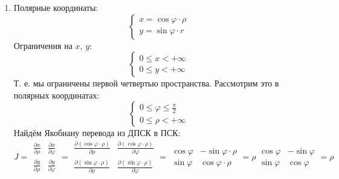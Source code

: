\begin{enumerate}
    \item
        Полярные координаты:
        \begin{equation}
            \begin{cases}
                x = \cos\varphi \cdot \rho \\
                y = \sin\varphi \cdot r
            \end{cases}
        \end{equation}
        Ограничения на $x$, $y$:
        \begin{equation}
            \begin{cases}
                0 \leq x < {+\infty} \\
                0 \leq y < {+\infty}
            \end{cases}
        \end{equation}
        Т. е. мы ограничены первой четвертью пространства. Рассмотрим это в полярных координатах: 
        \begin{equation}
            \begin{cases}
                0 \leq \varphi \leq \frac{\pi}{2} \\
                0 \leq \rho < {+\infty}
            \end{cases}
        \end{equation}
        Найдём Якобиану перевода из ДПСК в ПСК:
        $\displaystyle J = \begin{matrix}
            \frac{\partial x}{\partial \rho} & \frac{\partial x}{\partial \varphi} \\
            \frac{\partial y}{\partial \rho} & \frac{\partial y}{\partial \varphi}
        \end{matrix} = 
        \begin{matrix}
            \frac{\partial (\cos\varphi \cdot \rho)}{\partial \rho} & \frac{\partial (\cos\varphi \cdot \rho)}{\partial \varphi} \\
            \frac{\partial (\sin\varphi \cdot \rho)}{\partial \rho} & \frac{\partial (\sin\varphi \cdot \rho)}{\partial \varphi}
        \end{matrix} =
        \begin{matrix}
            \cos\varphi & -\sin\varphi \cdot \rho \\
            \sin\varphi & \cos\varphi \cdot \rho
        \end{matrix} =
        \rho \begin{matrix}
            \cos\varphi & -\sin\varphi \\
            \sin\varphi & \cos\varphi 
        \end{matrix} = \rho$


\end{enumerate}
